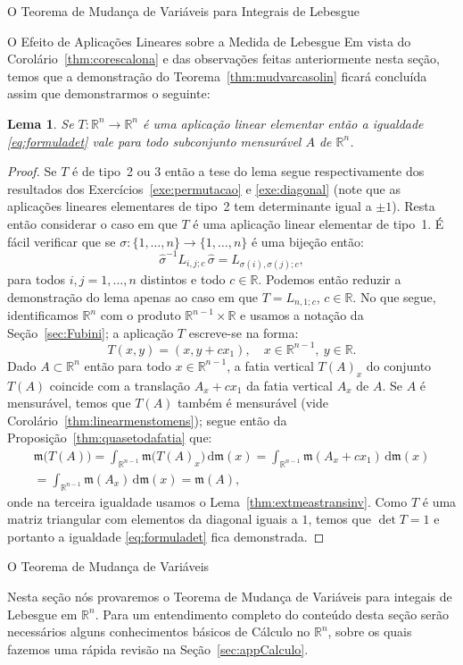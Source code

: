 \documentclass[oneside,final,11pt]{amsbook}
\newcommand{\R}{\mathds R}
\newcommand{\leb}{\mathfrak m}
\newcommand{\dd}{\mathrm d}
\theoremstyle{remark}\newtheorem{exercise}{Exercício}[chapter]
\theoremstyle{remark}\newtheorem{*exercise}[exercise]{\hbox to 0pt{\hskip 0pt minus 1fil*}Exercício}
\theoremstyle{definition}\newtheorem{exdefin}{Definição}[chapter]
\theoremstyle{plain}\newtheorem{teo}{Teorema}[section]
\theoremstyle{plain}\newtheorem{lem}[teo]{Lema}
\theoremstyle{plain}\newtheorem{prop}[teo]{Proposição}
\theoremstyle{plain}\newtheorem{cor}[teo]{Corolário}
\theoremstyle{definition}\newtheorem{defin}[teo]{Definição}
\theoremstyle{remark}\newtheorem{rem}[teo]{Observação}
\theoremstyle{definition}\newtheorem{notation}[teo]{Notação}
\theoremstyle{definition}\newtheorem{convention}[teo]{Convenção}
\theoremstyle{definition}\newtheorem{example}[teo]{Exemplo}
\numberwithin{section}{chapter}
\numberwithin{equation}{section}
\begin{document}
\begin{chapter}{O Teorema de Mudança de Variáveis para Integrais de Lebesgue}
\begin{section}{O Efeito de Aplicações Lineares sobre a Medida de Lebesgue}
Em vista do Corolário~\ref{thm:corescalona} e das observações feitas anteriormente nesta seção, temos que
a demonstração do Teorema~\ref{thm:mudvarcasolin} ficará concluída assim que demonstrarmos o seguinte:
\begin{lem}
Se $T:\R^n\to\R^n$ é uma aplicação linear elementar então a igualdade \eqref{eq:formuladet} vale para todo subconjunto
mensurável $A$ de $\R^n$.
\end{lem}
\begin{proof}
Se $T$ é de tipo~2 ou 3 então a tese do lema segue respectivamente dos resultados dos
Exercícios~\ref{exe:permutacao} e \ref{exe:diagonal} (note que as aplicações lineares elementares de tipo~2 tem determinante
igual a $\pm1$). Resta então considerar o caso em que $T$ é uma aplicação linear elementar de tipo~1.
É fácil verificar que se $\sigma:\{1,\ldots,n\}\to\{1,\ldots,n\}$ é uma bijeção então:
\[\widehat\sigma^{-1}L_{i,j;c}\,\widehat\sigma=L_{\sigma(i),\sigma(j);c},\]
para todos $i,j=1,\ldots,n$ distintos e todo $c\in\R$. Podemos então reduzir a demonstração do lema apenas ao caso
em que $T=L_{n,1;c}$, $c\in\R$. No que segue, identificamos $\R^n$ com o produto $\R^{n-1}\times\R$ e usamos a notação
da Seção~\ref{sec:Fubini}; a aplicação $T$ escreve-se na forma:
\[T(x,y)=(x,y+cx_1),\quad x\in\R^{n-1},\ y\in\R.\]
Dado $A\subset\R^n$ então para todo $x\in\R^{n-1}$, a fatia vertical $T(A)_x$ do conjunto $T(A)$
coincide com a translação $A_x+cx_1$ da fatia vertical $A_x$ de $A$. Se $A$ é mensurável, temos que $T(A)$ também é
mensurável (vide Corolário~\ref{thm:linearmenstomens}); segue então da Proposição~\ref{thm:quasetodafatia} que:
\begin{multline*}
\leb\big(T(A)\big)=\int_{\R^{n-1}}\leb\big(T(A)_x\big)\,\dd\leb(x)=\int_{\R^{n-1}}\leb(A_x+cx_1)\,\dd\leb(x)\\
=\int_{\R^{n-1}}\leb(A_x)\,\dd\leb(x)=\leb(A),
\end{multline*}
onde na terceira igualdade usamos o Lema~\ref{thm:extmeastransinv}. Como $T$ é uma matriz triangular com elementos
da diagonal iguais a $1$, temos que $\det T=1$ e portanto a igualdade \eqref{eq:formuladet} fica demonstrada.
\end{proof}

\end{section}

\begin{section}{O Teorema de Mudança de Variáveis}
\label{sec:teomudvar}

Nesta seção nós provaremos o Teorema de Mudança de Variáveis para integais de Lebesgue em $\R^n$. Para um entendimento
completo do conteúdo desta seção serão necessários alguns conhecimentos básicos de Cálculo no $\R^n$, sobre os quais fazemos
uma rápida revisão na Seção~\ref{sec:appCalculo}.


\end{section}
\end{chapter}
\end{document}
